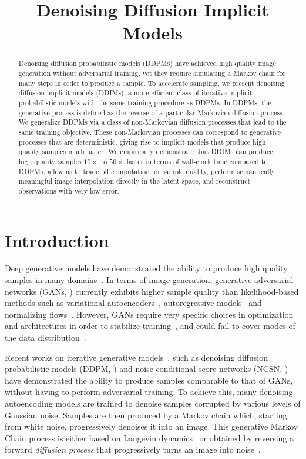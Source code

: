 \title{Denoising Diffusion Implicit Models}

\begin{abstract}
Denoising diffusion probabilistic models (DDPMs) have achieved high quality image generation without adversarial training, yet they require simulating a Markov chain for many steps in order to produce a sample. To accelerate sampling, we present denoising diffusion implicit models (DDIMs), a more efficient class of iterative implicit probabilistic models with the same training procedure as DDPMs. In DDPMs, the generative process is defined as the reverse of a particular Markovian diffusion process. We generalize DDPMs via a class of non-Markovian diffusion processes that lead to the same training objective. These non-Markovian processes can correspond to generative processes that are deterministic, giving rise to implicit models that produce high quality samples much faster. We empirically demonstrate that DDIMs can produce high quality samples $10 \times$ to $50 \times$ faster in terms of wall-clock time compared to DDPMs, allow us to trade off computation for sample quality, perform semantically meaningful image interpolation directly in the latent space, and reconstruct observations with very low error.
\end{abstract}

\section{Introduction}
Deep generative models have demonstrated the ability to produce high quality samples in many domains~\citep{karras2020analyzing,oord2016wavenet}. In terms of image generation, generative adversarial networks (GANs, \citet{goodfellow2014generative}) currently exhibits higher sample quality than likelihood-based methods such as variational autoencoders~\citep{kingma2013auto}, autoregressive models~\citep{oord2016pixel} and normalizing flows~\citep{rezende2015variational,dinh2016density}. However, GANs require very specific choices in optimization and architectures in order to stabilize training~\citep{arjovsky2017wasserstein,gulrajani2017improved,karras2018a,brock2018large}, and could fail to cover modes of the data distribution~\citep{zhao2018bias}.

Recent works on iterative generative models~\citep{bengio2014deep}, such as denoising diffusion probabilistic models (DDPM, \citet{ho2020denoising}) and noise conditional score networks (NCSN, \citet{song2019generative}) 
have demonstrated the ability to produce samples comparable to that of GANs, without having to perform adversarial training. To achieve this, many denoising autoencoding models are trained to denoise samples corrupted by various levels of Gaussian noise. Samples are then produced by a Markov chain which, starting from white noise, progressively denoises it into an image. This generative Markov Chain process is either based on Langevin dynamics~\citep{song2019generative} or obtained by reversing a forward \textit{diffusion process} that progressively turns an image into noise~\citep{sohl-dickstein2015deep}. 

